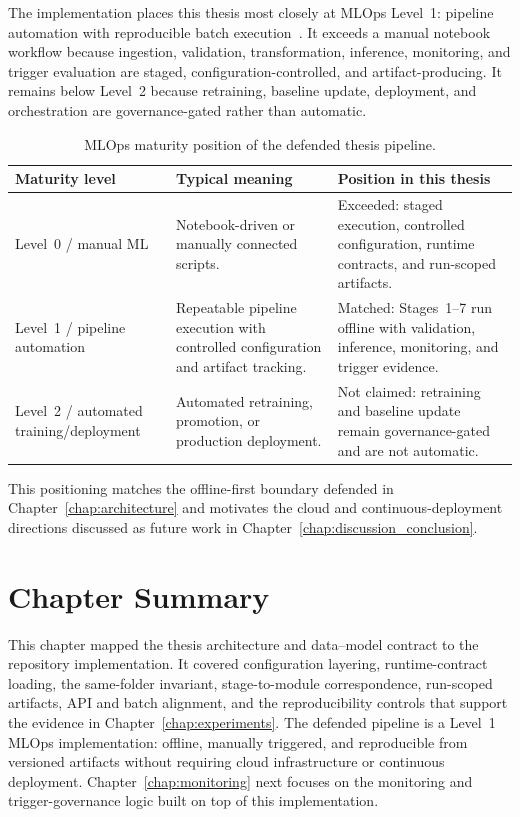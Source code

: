 The implementation places this thesis most closely at MLOps Level~1: pipeline automation with reproducible batch execution~\cite{kreuzberger2023mlops,hewage2022mlops}. It exceeds a manual notebook workflow because ingestion, validation, transformation, inference, monitoring, and trigger evaluation are staged, configuration-controlled, and artifact-producing. It remains below Level~2 because retraining, baseline update, deployment, and orchestration are governance-gated rather than automatic.

\begin{table}[H]
\centering
\scriptsize
\setlength{\tabcolsep}{3pt}
\renewcommand{\arraystretch}{1.08}
\caption[MLOps maturity position of the defended thesis pipeline.]{MLOps maturity position of the defended thesis pipeline.}
\label{tab:mlops_maturity_position}
\begin{tabularx}{\textwidth}{p{2.5cm} X X}
\toprule
\textbf{Maturity level} & \textbf{Typical meaning} & \textbf{Position in this thesis} \\
\midrule
Level~0 / manual ML
& Notebook-driven or manually connected scripts.
& Exceeded: staged execution, controlled configuration, runtime contracts, and run-scoped artifacts. \\
Level~1 / pipeline automation
& Repeatable pipeline execution with controlled configuration and artifact tracking.
& Matched: Stages~1--7 run offline with validation, inference, monitoring, and trigger evidence. \\
Level~2 / automated training/deployment
& Automated retraining, promotion, or production deployment.
& Not claimed: retraining and baseline update remain governance-gated and are not automatic. \\
\bottomrule
\end{tabularx}
\renewcommand{\arraystretch}{1.0}
\end{table}

This positioning matches the offline-first boundary defended in Chapter~\ref{chap:architecture} and motivates the cloud and continuous-deployment directions discussed as future work in Chapter~\ref{chap:discussion_conclusion}.

\section{Chapter Summary}
\label{sec:chapter5_summary}

This chapter mapped the thesis architecture and data--model contract to the repository implementation. It covered configuration layering, runtime-contract loading, the same-folder invariant, stage-to-module correspondence, run-scoped artifacts, API and batch alignment, and the reproducibility controls that support the evidence in Chapter~\ref{chap:experiments}. The defended pipeline is a Level~1 MLOps implementation: offline, manually triggered, and reproducible from versioned artifacts without requiring cloud infrastructure or continuous deployment. Chapter~\ref{chap:monitoring} next focuses on the monitoring and trigger-governance logic built on top of this implementation.
